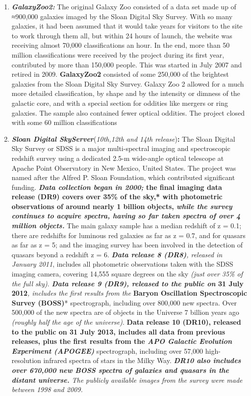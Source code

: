\documentclass[11pt]{article}
\begin{document}
\begin{enumerate}
\def\labelenumi{\arabic{enumi}.}
\setcounter{enumi}{1}
\item
  \textbf{\emph{GalaxyZoo2:}} The original Galaxy Zoo consisted of a
  data set made up of ≈900,000 galaxies imaged by the Sloan Digital Sky
  Survey. With so many galaxies, it had been assumed that it would take
  years for visitors to the site to work through them all, but within 24
  hours of launch, the website was receiving almost 70,000
  classifications an hour. In the end, more than 50 million
  classifications were received by the project during its first year,
  contributed by more than 150,000 people. This was started in July 2007
  and retired in 2009. \textbf{GalaxyZoo2} consisted of some 250,000 of
  the brightest galaxies from the Sloan Digital Sky Survey. Galaxy Zoo 2
  allowed for a much more detailed classification, by shape and by the
  intensity or dimness of the galactic core, and with a special section
  for oddities like mergers or ring galaxies. The sample also contained
  fewer optical oddities. The project closed with some 60 million
  classifications
\item
  \textbf{\emph{Sloan Digital SkyServer}}(\emph{10th,12th and 14th
  release})\textbf{:} The Sloan Digital Sky Survey or SDSS is a major
  multi-spectral imaging and spectroscopic redshift survey using a
  dedicated 2.5-m wide-angle optical telescope at Apache Point
  Observatory in New Mexico, United States. The project was named after
  the Alfred P. Sloan Foundation, which contributed significant funding.
  \textbf{\emph{Data collection began in 2000; }the final imaging data
  release (DR9) covers over 35\% of the sky,* with photometric
  observations of around nearly 1 billion objects, \emph{while the
  survey continues to acquire spectra, having so far taken spectra of
  over 4 million objects.}} The main galaxy sample has a median redshift
  of z = 0.1; there are redshifts for luminous red galaxies as far as z
  = 0.7, and for quasars as far as z = 5; and the imaging survey has
  been involved in the detection of quasars beyond a redshift z = 6.
  \emph{\textbf{Data release 8 (DR8)}, released in January 2011},
  includes all photometric observations taken with the SDSS imaging
  camera, covering 14,555 square degrees on the sky \emph{(just over
  35\% of the full sky)}. \textbf{\emph{Data release 9 (DR9), released
  to the public on }31 July 2012}\emph{, includes the first results from
  the }\textbf{Baryon Oscillation Spectroscopic Survey (BOSS)}*
  spectrograph, including over 800,000 new spectra. Over 500,000 of the
  new spectra are of objects in the Universe 7 billion years ago
  \emph{(roughly half the age of the universe)}. \textbf{Data release 10
  (DR10), released to the public on 31 July 2013, includes all data from
  previous releases, plus the first results from the \emph{APO Galactic
  Evolution Experiment (APOGEE)}} spectrograph, including over 57,000
  high-resolution infrared spectra of stars in the Milky Way.
  \textbf{\emph{DR10 also includes over 670,000 new BOSS spectra of
  galaxies and quasars in the distant universe.}} \emph{The publicly
  available images from the survey were made between 1998 and 2009.}
\end{enumerate}
\end{document}
